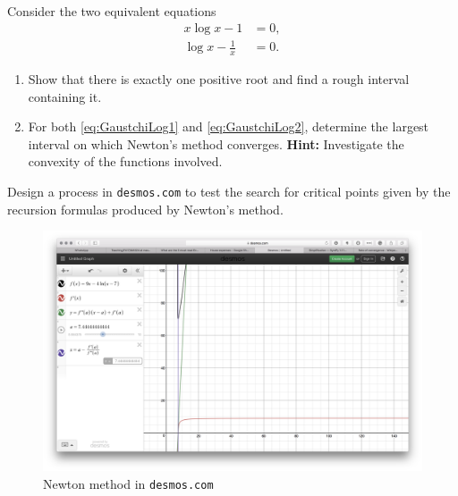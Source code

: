 \begin{problem}[Basic]
Consider the two equivalent equations
\begin{align}
x\log x -1 &= 0, \label{eq:GaustchiLog1} \\
\log x - \frac{1}{x} &= 0. \label{eq:GaustchiLog2}
\end{align}
\begin{enumerate}
	\item Show that there is exactly one positive root and find a rough interval containing it.
	\item For both \eqref{eq:GaustchiLog1} and \eqref{eq:GaustchiLog2}, determine the largest interval on which Newton's method converges. \newline \textbf{Hint: } Investigate the convexity of the functions involved.
\end{enumerate}
\end{problem}

\begin{problem}[CAS]
Design a process in \texttt{desmos.com} to test the search for critical points given by the recursion formulas produced by Newton's method.
\begin{figure}[ht!]
\includegraphics[width=\linewidth]{images/desmos.png}
\caption{Newton method in \texttt{desmos.com}}
\label{figure:desmosNewton}
\end{figure}
\end{problem}

